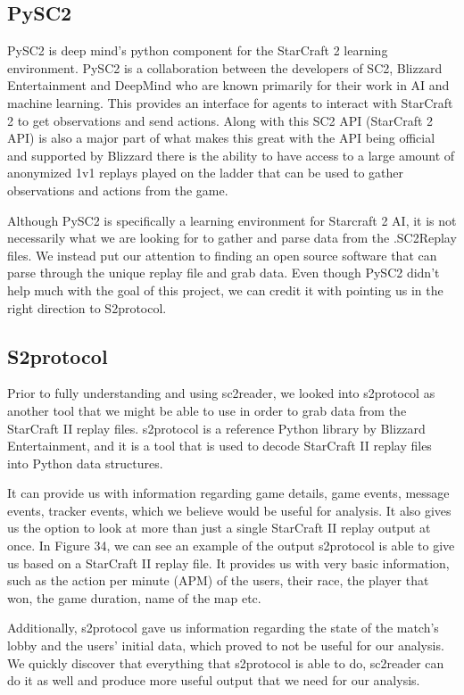 \documentclass[a4paper,12pt]{report}
\begin{document}
\subsection{PySC2}
PySC2 is deep mind’s python component for the StarCraft 2 learning environment. PySC2 is a collaboration between the developers of SC2, Blizzard Entertainment and DeepMind who are known primarily for their work in AI and machine learning. This provides an interface for agents to interact with StarCraft 2 to get observations and send actions. Along with this SC2 API (StarCraft 2 API) is also a major part of what makes this great with the API being official and supported by Blizzard there is the ability to have access to a large amount of anonymized 1v1 replays played on the ladder that can be used to gather observations and actions from the game.

Although PySC2 is specifically a learning environment for Starcraft 2 AI, it is not necessarily what we are looking for to gather and parse data from the .SC2Replay files. We instead put our attention to finding an open source software that can parse through the unique replay file and grab data. Even though PySC2 didn’t help much with the goal of this project, we can credit it with pointing us in the right direction to S2protocol.

\subsection{S2protocol}
Prior to fully understanding and using sc2reader, we looked into s2protocol as another tool that we might be able to use in order to grab data from the StarCraft II replay files. s2protocol is a reference Python library by Blizzard Entertainment, and it is a tool that is used to decode StarCraft II replay files into Python data structures.

It can provide us with information regarding game details, game events, message events, tracker events, which we believe would be useful for analysis. It also gives us the option to look at more than just a single StarCraft II replay output at once. In Figure 34, we can see an example of the output s2protocol is able to give us based on a StarCraft II replay file. It provides us with very basic information, such as the action per minute (APM) of the users, their race, the player that won, the game duration, name of the map etc.

Additionally, s2protocol gave us information regarding the state of the match’s lobby and the users’ initial data, which proved to not be useful for our analysis. We quickly discover that everything that s2protocol is able to do, sc2reader can do it as well and produce more useful output that we need for our analysis. 
\end{document}
